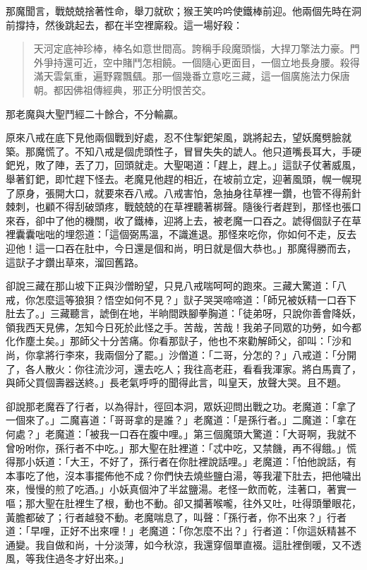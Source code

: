 那魔聞言，戰兢兢捨著性命，舉刀就砍；猴王笑吟吟使鐵棒前迎。他兩個先時在洞前撐持，然後跳起去，都在半空裡廝殺。這一場好殺：
\begin{quote}
天河定底神珍棒，棒名如意世間高。誇稱手段魔頭惱，大捍刀擎法力豪。門外爭持還可近，空中賭鬥怎相饒。一個隨心更面目，一個立地長身腰。殺得滿天雲氣重，遍野霧飄颻。那一個幾番立意吃三藏，這一個廣施法力保唐朝。都因佛祖傳經典，邪正分明恨苦交。
\end{quote}

那老魔與大聖鬥經二十餘合，不分輸贏。

原來八戒在底下見他兩個戰到好處，忍不住掣鈀架風，跳將起去，望妖魔劈臉就築。那魔慌了。不知八戒是個虎頭性子，冒冒失失的諕人。他只道嘴長耳大，手硬鈀兇，敗了陣，丟了刀，回頭就走。大聖喝道：「趕上，趕上。」這獃子仗著威風，舉著釘鈀，即忙趕下怪去。老魔見他趕的相近，在坡前立定，迎著風頭，幌一幌現了原身，張開大口，就要來吞八戒。八戒害怕，急抽身往草裡一鑽，也管不得荊針棘刺，也顧不得刮破頭疼，戰兢兢的在草裡聽著梆聲。隨後行者趕到，那怪也張口來吞，卻中了他的機關，收了鐵棒，迎將上去，被老魔一口吞之。諕得個獃子在草裡囊囊咄咄的埋怨道：「這個弼馬溫，不識進退。那怪來吃你，你如何不走，反去迎他！這一口吞在肚中，今日還是個和尚，明日就是個大恭也。」那魔得勝而去，這獃子才鑽出草來，溜回舊路。

卻說三藏在那山坡下正與沙僧盼望，只見八戒喘呵呵的跑來。三藏大驚道：「八戒，你怎麼這等狼狽？悟空如何不見？」獃子哭哭啼啼道：「師兄被妖精一口吞下肚去了。」三藏聽言，諕倒在地，半晌間跌腳拳胸道：「徒弟呀，只說你善會降妖，領我西天見佛，怎知今日死於此怪之手。苦哉，苦哉！我弟子同眾的功勞，如今都化作塵土矣。」那師父十分苦痛。你看那獃子，他也不來勸解師父，卻叫：「沙和尚，你拿將行李來，我兩個分了罷。」沙僧道：「二哥，分怎的？」八戒道：「分開了，各人散火：你往流沙河，還去吃人；我往高老莊，看看我渾家。將白馬賣了，與師父買個壽器送終。」長老氣呼呼的聞得此言，叫皇天，放聲大哭。且不題。

卻說那老魔吞了行者，以為得計，徑回本洞，眾妖迎問出戰之功。老魔道：「拿了一個來了。」二魔喜道：「哥哥拿的是誰？」老魔道：「是孫行者。」二魔道：「拿在何處？」老魔道：「被我一口吞在腹中哩。」第三個魔頭大驚道：「大哥啊，我就不曾吩咐你，孫行者不中吃。」那大聖在肚裡道：「忒中吃，又禁饑，再不得餓。」慌得那小妖道：「大王，不好了，孫行者在你肚裡說話哩。」老魔道：「怕他說話，有本事吃了他，沒本事擺佈他不成？你們快去燒些鹽白湯，等我灌下肚去，把他噦出來，慢慢的煎了吃酒。」小妖真個沖了半盆鹽湯。老怪一飲而乾，洼著口，著實一嘔；那大聖在肚裡生了根，動也不動。卻又攔著喉嚨，往外又吐，吐得頭暈眼花，黃膽都破了；行者越發不動。老魔喘息了，叫聲：「孫行者，你不出來？」行者道：「早哩，正好不出來哩！」老魔道：「你怎麼不出？」行者道：「你這妖精甚不通變。我自做和尚，十分淡薄，如今秋涼，我還穿個單直裰。這肚裡倒暖，又不透風，等我住過冬才好出來。」

